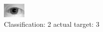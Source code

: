 \begin{figure}[h!]
\begin{center}
\includegraphics[width=0.60\columnwidth]{figures/ID1146_class_2_target_3.png}
\end{center}
\caption{ Classification: 2 actual target: 3}
\label{fig:ID1146_class_2_target_3}
\end{figure}
